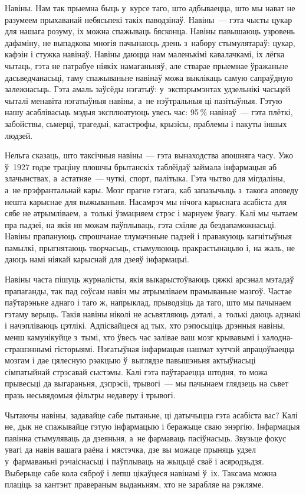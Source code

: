 Навіны. Нам так прыемна быць у~курсе таго, што адбываецца, што мы нават не разумеем прыхаванай небясьпекі такіх паводзінаў. Навіны~--- гэта чысты цукар для нашага розуму, іх можна спажываць бясконца. Навіны павышаюць узровень дафаміну, не выпадкова многія пачынаюць дзень з~набору стымулятараў: цукар, кафэін і стужка навінаў. Навіны даюцца нам маленькімі кавалачкамі, іх лёгка чытаць, гэта не патрабуе ніякіх намаганьняў, але стварае прыемнае ўражаньне дасьведчанасьці, таму спажываньне навінаў можа выклікаць самую сапраўдную залежнасьць. Гэта амаль заўсёды нэгатыў: у~экспэрымэнтах удзельнікі часьцей чыталі менавіта нэгатыўныя навіны, а~не нэўтральныя ці пазітыўныя. Гэтую нашу асаблівасьць мэдыя эксплюатуюць увесь час: 95\,\% навінаў~--- гэта плёткі, забойствы, сьмерці, трагедыі, катастрофы, крызісы, праблемы і пакуты іншых людзей.

Нельга сказаць, што таксічныя навіны~--- гэта вынаходства апошняга часу. Ужо ў~1927 годзе траціну плошчы брытанскіх таблёідаў займала інфармацыя аб злачынствах, а~астатняе~--- чуткі, спорт, палітыка. Гэта чытво для мігдаліны, а~не прэфрантальнай кары. Мозг прагне гэтага, каб запазычыць з~такога аповеду нешта карыснае для выжываньня. Насамрэч мы нічога карыснага асабіста для сябе не атрымліваем, а~толькі ўзмацняем стрэс і марнуем ўвагу. Калі мы чытаем пра падзеі, на якія ня можам паўплываць, гэта схіляе да бездапаможнасьці. Навіны прапануюць спрошчанае тлумачэньне падзей і правакуюць кагнітыўныя памылкі, прыгнятаюць творчасьць, стымулююць пракрастынацыю і, на жаль, не даюць намі ніякай карыснай для дзеяў інфармацыі.

Навіны часта пішуць журналісты, якія выкарыстоўваюць цяжкі арсэнал мэтадаў прапаганды, так пад соўсам навін мы атрымліваем прамываньне мазгоў. Частае паўтарэньне аднаго і таго ж, напрыклад, прыводзіць да таго, што мы пачынаем гэтаму верыць. Такія навіны ніколі не асьвятляюць дэталі, а~толькі даюць адзнакі і начэпліваюць цэтлікі. Адпісвайцеся ад тых, хто рэпосьціць дрэнныя навіны, менш камунікуйце з~тымі, хто ўвесь час залівае ваш мозг крывавымі і халодна-страшэннымі гісторыямі. Нэгатыўная інфармацыя нашмат хутчэй апрацоўваецца мозгам і дае цялесную рэакцыю ў~выглядзе павышэньня актыўнасьці сімпатыйнай стрэсавай сыстэмы. Калі гэта паўтараецца штодня, то можа прывесьці да выгараньня, дэпрэсіі, трывогі~--- мы пачынаем глядзець на сьвет празь несьвядомыя фільтры недаверу і трывогі.

Чытаючы навіны, задавайце сабе пытаньне, ці датычыцца гэта асабіста вас? Калі не, дык не спажывайце гэтую інфармацыю і беражыце сваю энэргію. Інфармацыя павінна стымуляваць да дзеяньня, а~не фармаваць пасіўнасьць. Звузьце фокус увагі да навін вашага раёна і мястэчка, дзе вы можаце прыняць удзел у~фармаваньні рэчаіснасьці і паўплываць на жыцьцё сваё і асяродзьдзя. Выберыце сабе кола сяброў і лепш цікаўцеся навінамі ў~іх. Таксама можна плаціць за кантэнт правераным выданьням, хто не зарабляе на рэкляме.

